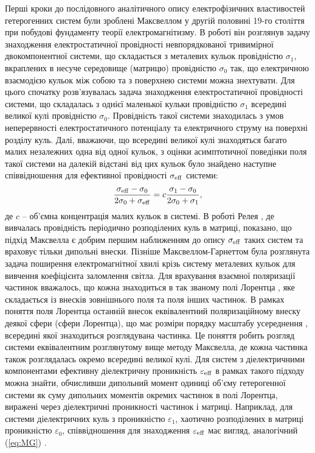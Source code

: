 \documentclass[14pt,twoside]{vakthesis}
\begin{document}
Перші кроки до послідовного аналітичного опису електрофізичних властивостей гетерогенних систем були зроблені Максвеллом у другій половині 19-го століття при побудові фундаменту теорії електромагнітизму.
В роботі \cite{Maxwell1892} він розглянув задачу знаходження електростатичної провідності невпорядкованої тривимірної двокомпонентної системи, що складається з металевих кульок провідністю $\sigma_1$, вкраплених в несуче середовище (матрицю) провідністю $\sigma_0$ так, що електричною взаємодією кульок між собою та з поверхнею системи можна знехтувати. 
Для цього спочатку розв'язувалась задача знаходження електростатичної провідності системи, що складалась з однієї маленької кульки провідністю $\sigma_1$ всередині великої кулі провідністю $\sigma_0$. Провідність такої системи знаходилась з умов неперервності електростатичного потенціалу та електричного струму на поверхні розділу куль. Далі, вважаючи, що всередині великої кулі знаходяться багато малих незалежних одна від одної кульок, з оцінки асимптотичної поведінки поля такої системи на далекій відстані від цих кульок  було знайдено наступне співвідношення для ефективної провідності $\sigma_{\rm eff}$  системи:
\begin{equation}\label{eq:MG}
\frac{\sigma_{\rm eff} - \sigma_0}{2\sigma_0 + \sigma_{\rm eff}} = c \frac{\sigma_1 - \sigma_0}{2\sigma_0 + \sigma_1},
\end{equation}
де $c$ -- об'ємна концентрація малих кульок в системі. 
В роботі Релея \cite{Rayleigh}, де вивчалась провідність періодично розподілених куль в матриці, показано, що підхід Максвелла є добрим першим наближенням до опису $\sigma_{\rm eff}$ таких систем та враховує тільки дипольні внески.
Пізніше Максвеллом-Гарнеттом  \cite{M-G1904} була розглянута задача поширення електромагнітної хвилі крізь систему металевих кульок для вивчення коефіцієнта заломлення світла. Для врахування взаємної поляризації частинок вважалось, що кожна знаходиться в так званому полі Лорентца \cite{Lorentz1870, Choy}, яке складається із внесків зовнішнього поля та поля інших частинок. В рамках поняття поля Лорентца останній внесок еквівалентний поляризаційному внеску деякої сфери (сфери Лорентца), що має розміри порядку масштабу усереднення \cite{Choy}, всередині якої знаходиться розглядувана частинка. 
Це поняття робить розгляд системи еквівалентним розглянутому вище методу Максвелла, де кожна частинка також розглядалась окремо всередині великої кулі.
Для систем з діелектричними компонентами ефективну діелектричну проникність $\varepsilon_{\rm eff}$ в рамках такого підходу можна знайти, обчисливши дипольний момент одиниці об'єму гетерогенної системи як суму дипольних моментів окремих частинок в полі Лорентца, виражені через діелектричні проникності частинок і матриці.
Наприклад, для системи діелектричних куль з проникністю $\varepsilon_1$, хаотично розподілених в матриці проникністю $\varepsilon_0$, співвідношення для знаходження $\varepsilon_{\rm eff}$ має вигляд, аналогічний (\ref{eq:MG}) \cite{Markel2016,Choy}.
\end{document}
